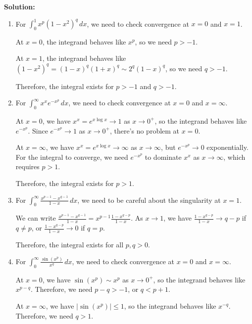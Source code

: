 \bigskip\noindent\textbf{Solution:}
\begin{enumerate}[label=(\alph*)]
    \item For $\int_{0}^{1} x^p (1 - x^2)^q \, dx$, we need to check convergence at $x = 0$ and $x = 1$.
    
    At $x = 0$, the integrand behaves like $x^p$, so we need $p > -1$.
    
    At $x = 1$, the integrand behaves like $(1 - x^2)^q = (1 - x)^q (1 + x)^q \sim 2^q (1 - x)^q$, so we need $q > -1$.
    
    Therefore, the integral exists for $p > -1$ and $q > -1$.
    
    \item For $\int_{0}^{\infty} x^x e^{-x^p} \, dx$, we need to check convergence at $x = 0$ and $x = \infty$.
    
    At $x = 0$, we have $x^x = e^{x \log x} \to 1$ as $x \to 0^+$, so the integrand behaves like $e^{-x^p}$. Since $e^{-x^p} \to 1$ as $x \to 0^+$, there's no problem at $x = 0$.
    
    At $x = \infty$, we have $x^x = e^{x \log x} \to \infty$ as $x \to \infty$, but $e^{-x^p} \to 0$ exponentially. For the integral to converge, we need $e^{-x^p}$ to dominate $x^x$ as $x \to \infty$, which requires $p > 1$.
    
    Therefore, the integral exists for $p > 1$.
    
    \item For $\int_{0}^{\infty} \frac{x^{p-1} - x^{q-1}}{1 - x} \, dx$, we need to be careful about the singularity at $x = 1$.
    
    We can write $\frac{x^{p-1} - x^{q-1}}{1 - x} = x^{p-1} \frac{1 - x^{q-p}}{1 - x}$. As $x \to 1$, we have $\frac{1 - x^{q-p}}{1 - x} \to q - p$ if $q \neq p$, or $\frac{1 - x^{q-p}}{1 - x} \to 0$ if $q = p$.
    
    Therefore, the integral exists for all $p, q > 0$.
    
    \item For $\int_{0}^{\infty} \frac{\sin(x^p)}{x^q} \, dx$, we need to check convergence at $x = 0$ and $x = \infty$.
    
    At $x = 0$, we have $\sin(x^p) \sim x^p$ as $x \to 0^+$, so the integrand behaves like $x^{p-q}$. Therefore, we need $p - q > -1$, or $q < p + 1$.
    
    At $x = \infty$, we have $|\sin(x^p)| \leq 1$, so the integrand behaves like $x^{-q}$. Therefore, we need $q > 1$.
    

\end{enumerate}
